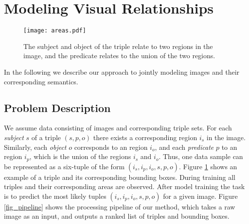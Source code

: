 \documentclass[runningheads,a4paper]{llncs}
\begin{document}
\section{Modeling Visual Relationships}
\label{section_model}

\begin{figure}[t]
\centering
\texttt{[image: areas.pdf]}
\caption{The subject and object of the triple relate to two regions in the image, and the predicate relates to the union of the two regions.}
\label{fig_areas}
\end{figure}


In the following we describe our approach to jointly modeling images and their corresponding semantics. 

\subsection{Problem Description}

We assume data consisting of images and corresponding triple sets. For each \textit{subject} $s$ of a triple $(s,p,o)$ there exists a corresponding region $i_s$ in the image. Similarly, each \textit{object} $o$ corresponds to an region $i_o$, and each \textit{predicate} $p$ to an region $i_p$, which is the union of the regions $i_s$ and $i_o$. Thus, one data sample can be represented as a six-tuple of the form $(i_s, i_p, i_o, s, p, o)$. Figure \ref{fig_areas} shows an example of a triple and its corresponding bounding boxes. During training all triples and their corresponding areas are observed. After model training the task is to predict the most likely tuples $(i_s, i_p, i_o, s, p, o)$ for a given image. Figure \ref{fig_pipeline} shows the processing pipeline of our method, which takes a raw image as an input, and outputs a ranked list of triples and bounding boxes.


 

\end{document}
